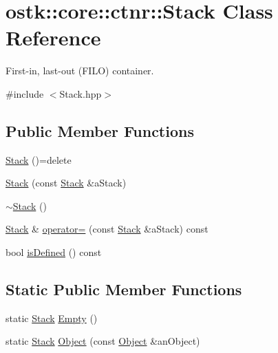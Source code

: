 \hypertarget{classostk_1_1core_1_1ctnr_1_1_stack}{}\section{ostk\+:\+:core\+:\+:ctnr\+:\+:Stack Class Reference}
\label{classostk_1_1core_1_1ctnr_1_1_stack}


First-\/in, last-\/out (F\+I\+LO) container.  




{\ttfamily \#include $<$Stack.\+hpp$>$}

\subsection*{Public Member Functions}
\begin{DoxyCompactItemize}
\item 
\hyperlink{classostk_1_1core_1_1ctnr_1_1_stack_a0e02851144c2afaf2202846f90f950dc}{Stack} ()=delete
\item 
\hyperlink{classostk_1_1core_1_1ctnr_1_1_stack_add08ce0c3b6aaff44811abbe708bde78}{Stack} (const \hyperlink{classostk_1_1core_1_1ctnr_1_1_stack}{Stack} \&a\+Stack)
\item 
\hyperlink{classostk_1_1core_1_1ctnr_1_1_stack_afab136f4d7fbeeda04d89acc3be0b2b1}{$\sim$\+Stack} ()
\item 
\hyperlink{classostk_1_1core_1_1ctnr_1_1_stack}{Stack} \& \hyperlink{classostk_1_1core_1_1ctnr_1_1_stack_af5f86fc835c6e3d724a2f4c9d474b2a7}{operator=} (const \hyperlink{classostk_1_1core_1_1ctnr_1_1_stack}{Stack} \&a\+Stack) const
\item 
bool \hyperlink{classostk_1_1core_1_1ctnr_1_1_stack_a146e0c3f6914afa9e23106c395f895d2}{is\+Defined} () const
\end{DoxyCompactItemize}
\subsection*{Static Public Member Functions}
\begin{DoxyCompactItemize}
\item 
static \hyperlink{classostk_1_1core_1_1ctnr_1_1_stack}{Stack} \hyperlink{classostk_1_1core_1_1ctnr_1_1_stack_a720ccdf651af0a9d0b5659dea501d355}{Empty} ()
\item 
static \hyperlink{classostk_1_1core_1_1ctnr_1_1_stack}{Stack} \hyperlink{classostk_1_1core_1_1ctnr_1_1_stack_ac9a70eb14c3f8c1d6eb46ac5ea003714}{Object} (const \hyperlink{classostk_1_1core_1_1ctnr_1_1_object}{Object} \&an\+Object)
\end{DoxyCompactItemize}
